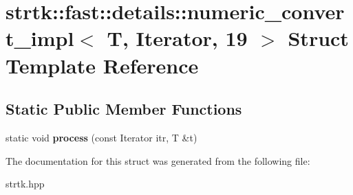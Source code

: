 \hypertarget{structstrtk_1_1fast_1_1details_1_1numeric__convert__impl_3_01T_00_01Iterator_00_0119_01_4}{\section{strtk\-:\-:fast\-:\-:details\-:\-:numeric\-\_\-convert\-\_\-impl$<$ T, Iterator, 19 $>$ Struct Template Reference}
\label{structstrtk_1_1fast_1_1details_1_1numeric__convert__impl_3_01T_00_01Iterator_00_0119_01_4}
}
\subsection*{Static Public Member Functions}
\begin{DoxyCompactItemize}
\item 
\hypertarget{structstrtk_1_1fast_1_1details_1_1numeric__convert__impl_3_01T_00_01Iterator_00_0119_01_4_ac77a2e5e537a562ab90a242e9327a7a1}{static void {\bfseries process} (const Iterator itr, T \&t)}\label{structstrtk_1_1fast_1_1details_1_1numeric__convert__impl_3_01T_00_01Iterator_00_0119_01_4_ac77a2e5e537a562ab90a242e9327a7a1}

\end{DoxyCompactItemize}


The documentation for this struct was generated from the following file\-:\begin{DoxyCompactItemize}
\item 
strtk.\-hpp\end{DoxyCompactItemize}
